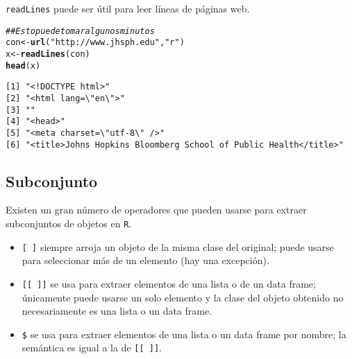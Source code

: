\documentclass{article}\usepackage[]{graphicx}\usepackage[]{color}
\makeatletter
\newcommand{\hlstr}[1]{\textcolor[rgb]{0.192,0.494,0.8}{#1}}%
\newcommand{\hlcom}[1]{\textcolor[rgb]{0.678,0.584,0.686}{\textit{#1}}}%
\newcommand{\hlstd}[1]{\textcolor[rgb]{0.345,0.345,0.345}{#1}}%
\newcommand{\hlkwb}[1]{\textcolor[rgb]{0.69,0.353,0.396}{#1}}%
\newcommand{\hlkwd}[1]{\textcolor[rgb]{0.737,0.353,0.396}{\textbf{#1}}}%
\newenvironment{kframe}{%
 \def\at@end@of@kframe{}%
 \ifinner\ifhmode%
  \def\at@end@of@kframe{\end{minipage}}%
  \begin{minipage}{\columnwidth}%
 \fi\fi%
 \def\FrameCommand##1{\hskip\@totalleftmargin \hskip-\fboxsep
 \colorbox{shadecolor}{##1}\hskip-\fboxsep
     \hskip-\linewidth \hskip-\@totalleftmargin \hskip\columnwidth}%
 \MakeFramed {\advance\hsize-\width
   \@totalleftmargin\z@ \linewidth\hsize
   \@setminipage}}%
 {\par\unskip\endMakeFramed%
 \at@end@of@kframe}
\newenvironment{knitrout}{}{} %
\makeatother
\begin{document}
  \texttt{readLines} puede ser útil para leer líneas de páginas web.
\begin{knitrout}
\color{fgcolor}\begin{kframe}
\begin{alltt}
  \hlcom{## Esto puede tomar algunos minutos}
  \hlstd{con} \hlkwb{<-} \hlkwd{url}\hlstd{(}\hlstr{"http://www.jhsph.edu"}\hlstd{,} \hlstr{"r"}\hlstd{)}
  \hlstd{x} \hlkwb{<-} \hlkwd{readLines}\hlstd{(con)}
  \hlkwd{head}\hlstd{(x)}
\end{alltt}
\begin{verbatim}
[1] "<!DOCTYPE html>"                                               
[2] "<html lang=\"en\">"                                            
[3] ""                                                              
[4] "<head>"                                                        
[5] "<meta charset=\"utf-8\" />"                                    
[6] "<title>Johns Hopkins Bloomberg School of Public Health</title>"
\end{verbatim}
\end{kframe}
\end{knitrout}

  \subsection{Subconjunto}
  Existen un gran número de operadores que pueden usarse para extraer subconjuntos de objetos en \texttt{R}. 
  \begin{itemize}
    \item \texttt{[ ]} siempre arroja un objeto de la misma clase del original; puede usarse para seleccionar más de un elemento (hay una excepción).
    \item \texttt{[[ ]]} se usa para extraer elementos de una lista o de un data frame; únicamente puede usarse un solo elemento y la clase del objeto obtenido no necesariamente es una lista o un data frame.
    \item \texttt{\$} se usa para extraer elementos de una lista o un data frame por nombre; la semántica es igual a la de \texttt{[[ ]]}.
  \end{itemize}
\end{document}

